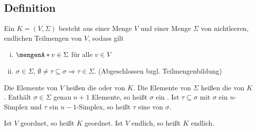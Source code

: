 \subsection[Definition: Simplizialer Komplex]{Definition} %
\label{sub:22}
Ein  $K=(V, \Sigma)$ besteht aus einer Menge $V$ und einer Menge $\Sigma$ von nichtleeren, endlichen Teilmengen von $V$, sodass gilt
\begin{enumerate}[(i)]
	\item $\set{v} \in \Sigma$ für alle $v \in V$
	\item $\sigma \in \Sigma$, $\emptyset \not= \tau \subseteq \sigma \Longrightarrow \tau \in\Sigma.$ \hfill {\footnotesize(Abgeschlossen bzgl. Teilmengenbildung)}
\end{enumerate}
Die Elemente von $V$ heißen die  oder  von $K$. Die Elemente von $\Sigma$ heißen die  von $K$. Enthält $\sigma \in \Sigma$ 
genau $n+1$ Elemente, so heißt $\sigma$ ein . Ist $\tau \subseteq \sigma$ mit $\sigma$ ein $n$-Simplex und $\tau$ ein $n-1$-Simplex, so heißt $\tau$ eine  von $\sigma$. 

\noindent Ist $V$ geordnet, so heißt $K$ geordnet. Ist $V$ endlich, so heißt $K$ endlich.

